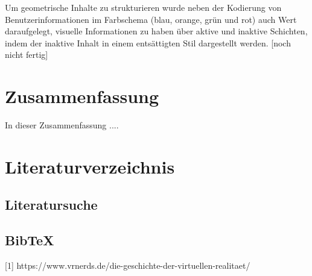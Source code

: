 \documentclass[deutsch]{llncs}
\begin{document}
Um geometrische Inhalte zu strukturieren wurde neben der Kodierung von Benutzerinformationen im Farbschema (blau, orange, grün und rot) auch Wert daraufgelegt, visuelle Informationen zu haben über aktive und inaktive Schichten, indem der inaktive Inhalt in einem entsättigten Stil dargestellt werden. [noch nicht fertig]\\



\section{Zusammenfassung}
\label{sec:typo}
In dieser Zusammenfassung .... 

\section{Literaturverzeichnis}
\label{sec:bib}

\subsection{Literatursuche}
\label{subsec:search}


\subsection{BibTeX}
\label{subsec:bibtex}
[1] https://www.vrnerds.de/die-geschichte-der-virtuellen-realitaet/
\cite{2 http://virtualrealityforeducation.com/wp-content/uploads/2018/06/HuAu_Lee_2017_VRinEd.pdf}

\printbibliography
\end{document}
